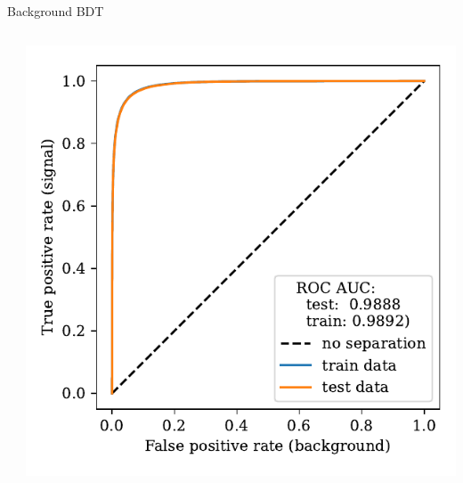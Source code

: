 \documentclass[aspectratio=1610, 10pt]{beamer}
\begin{document}
\begin{frame}{Background BDT}
\begin{columns}
\begin{column}{0.33\textwidth}
    \end{column}
    \begin{column}{0.33\textwidth}
      \centering
      \includegraphics[width=\textwidth]{images/backup/bkg_roc.pdf}
    \end{column}
  \end{columns}
\end{frame}
\end{document}
